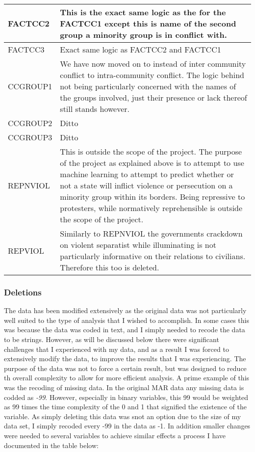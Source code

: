 \documentclass[12pt]{article}
\begin{document}
\begin{center}
\begin{longtable}{p{3cm}p{10cm}}
\hline 
FACTCC2 & This is the exact same logic as the for the FACTCC1 except this is name of the second group a minority group is in conflict with. \\
\hline
FACTCC3 & Exact same logic as FACTCC2 and FACTCC1\\
\hline
CCGROUP1 & We have now moved on to instead of inter community conflict to intra-community conflict. The logic behind not being particularly concerned with the names of the groups involved, just their presence or lack thereof still stands however.\\
\hline
CCGROUP2 & Ditto \\
\hline
CCGROUP3 & Ditto \\
\hline
REPNVIOL & This is outside the scope of the project. The purpose of the project as explained above is to attempt to use machine learning to attempt to predict whether or not a state will inflict violence or persecution on a minority group within its borders. Being repressive to protesters, while normatively reprehensible is outside the scope of the project.\\
\hline
REPVIOL & Similarly to REPNVIOL the governments crackdown on violent separatist while illuminating is not particularly informative on their relations to civilians. Therefore this too is deleted. 
\end{longtable}
\end{center}

\subsubsection{Deletions}
The data has been modified extensively as the original data was not particularly well suited to the type of analysis that I wished to accomplish. In some cases this was because the data was coded in text, and I simply needed to recode the data to be strings. However, as will be discussed below there were significant challenges that I experienced with my data, and as a result I was forced to extensively modify the data, to improve the results that I was experiencing. The purpose of the data was not to force a certain result, but was designed to reduce th overall complexity to allow for more efficient analysis. A prime example of this was the recoding of missing data. In the original MAR data any missing data is codded as {\em -99}. However, especially in binary variables, this 99 would be weighted as 99 times the time complexity of the 0 and 1 that signified the existence of the variable. As simply deleting this data was snot an option due to the size of my data set, I simply recoded every -99 in the data as -1. In addition smaller changes were needed to several variables to achieve similar effects a process I have documented in the table below: 
\end{document}
